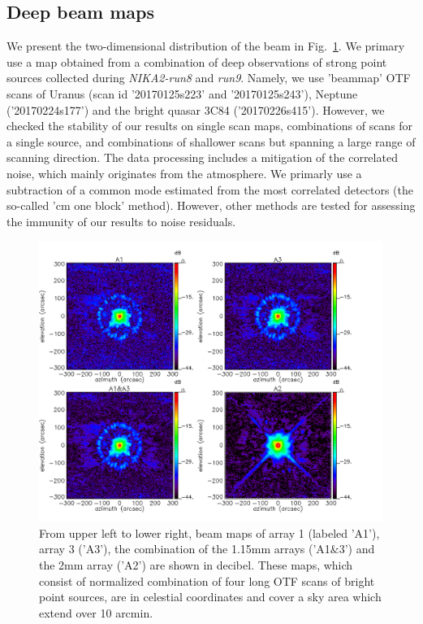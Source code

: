 \subsection{Deep beam maps}
\label{se:deep_beam_maps}
We present the two-dimensional distribution of the beam in
Fig.~\ref{fig:beam}. We primary use a map obtained from a combination
of deep observations of strong point sources collected during
\emph{NIKA2-run8} and \emph{run9}. Namely, we use 'beammap' OTF scans
of Uranus (scan id '20170125s223' and '20170125s243'),  Neptune
('20170224s177') and the bright quasar 3C84 ('20170226s415'). However,
we checked the stability of our results on single scan maps,
combinations of scans for a single source, and combinations of
shallower scans but spanning a large range of scanning direction. The
data processing includes a mitigation of the correlated noise, which
mainly originates from the atmosphere.  We primarly use a subtraction
of a common mode estimated from the most correlated detectors (the
so-called 'cm one block' method). However, other methods are tested
for assessing the immunity of our results to noise residuals.

\begin{figure}[ht!]
\begin{center}
  \includegraphics[clip, angle=0, scale=0.4]{Figures/Lobe_map_Combo_v2_dB.pdf}
 \caption[Beam pattern.]{From upper left to lower right, beam maps of array 1 (labeled 'A1'), array 3 ('A3'), the combination of the 1.15mm arrays ('A1$\&$3') and the 2mm array ('A2') are shown in decibel. These maps, which consist of normalized combination of four long OTF scans of bright point sources, are in celestial coordinates and cover a sky area which extend over 10 arcmin.}
\label{fig:beam}
\end{center}
\end{figure}

